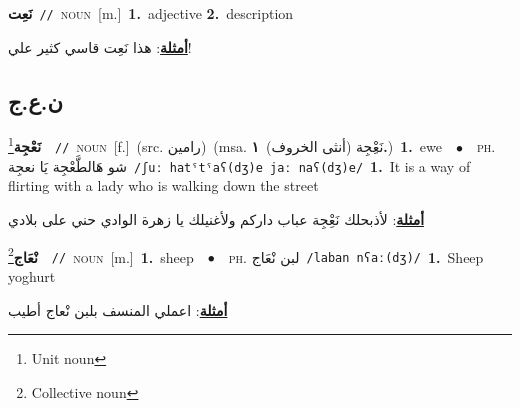 \documentclass[10pt,a4paper,twoside]{article} %
\begin{document}
\begin{multicols}{2}
{\setlength\topsep{0pt}\textbf{\foreignlanguage{arabic}{نَعِت}}\ {\color{gray}\texttt{//}\color{black}}\ \textsc{noun}\ [m.]\ \textbf{1.}~adjective  \textbf{2.}~description\  \begin{flushright}\color{gray}\foreignlanguage{arabic}{\textbf{\underline{\foreignlanguage{arabic}{أمثلة}}}: هذا نَعِت قاسي كثير علي!}\end{flushright}\color{black}} \vspace{2mm}

\vspace{-3mm}
\subsection*{\color{blue}\foreignlanguage{arabic}{ن.ع.ج}\color{blue}{}} 

{\setlength\topsep{0pt}\textbf{\foreignlanguage{arabic}{نَعْجِة}}\footnote{Unit noun}\ \ {\color{gray}\texttt{//}\color{black}}\ \textsc{noun}\ [f.]\ (src. \color{gray}\foreignlanguage{arabic}{رامين}\color{black})\ \color{gray}(msa. \foreignlanguage{arabic}{نَعِْجِة (أنثى الخروف)}~\foreignlanguage{arabic}{\textbf{١.}})\color{black}\ \textbf{1.}~ewe\ \ $\bullet$\ \ \textsc{ph.} \color{gray} \foreignlanguage{arabic}{شو هَالطَّعْجِة يَا نعجِة}\color{black}\ {\color{gray}\texttt{/{\sffamily ʃuː hatˤtˤaʕ(dʒ)e jaː naʕ(dʒ)e}/}\color{black}}\ \textbf{1.}~It is a way of flirting with a lady who is walking down the street\  \begin{flushright}\color{gray}\foreignlanguage{arabic}{\textbf{\underline{\foreignlanguage{arabic}{أمثلة}}}: لأذبحلك نَعِْجِة عباب داركم ولأغنيلك يا زهرة الوادي حني على بلادي}\end{flushright}\color{black}} \vspace{2mm}

{\setlength\topsep{0pt}\textbf{\foreignlanguage{arabic}{نْعَاج}}\footnote{Collective noun}\ \ {\color{gray}\texttt{//}\color{black}}\ \textsc{noun}\ [m.]\ \textbf{1.}~sheep\ \ $\bullet$\ \ \textsc{ph.} \color{gray} \foreignlanguage{arabic}{لبن نْعَاج}\color{black}\ {\color{gray}\texttt{/{\sffamily laban nʕaː(dʒ)}/}\color{black}}\ \textbf{1.}~Sheep yoghurt\  \begin{flushright}\color{gray}\foreignlanguage{arabic}{\textbf{\underline{\foreignlanguage{arabic}{أمثلة}}}: اعملي المنسف بلبن نْعاج أطيب}\end{flushright}\color{black}} \vspace{2mm}


\end{multicols}
\end{document}
